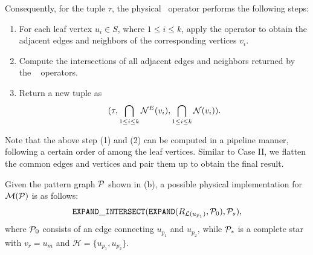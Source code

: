 Consequently, for the tuple $\tau$, the physical ~operator performs the following steps:

\begin{enumerate}
\item For each leaf vertex $u_i \in S$, where $1 \leq i \leq k$, apply the  operator to obtain the adjacent edges and neighbors of the corresponding vertices $v_i$.
\item Compute the intersections of all adjacent edges and neighbors returned by the \expand~ operators.
\item Return a new tuple as
\[
    (\tau, \bigcap_{1 \leq i \leq k}{\mathcal{N}}^E(v_i), \bigcap_{1 \leq i \leq k}{\mathcal{N}}(v_i)).
\]
\end{enumerate}

Note that the above step (1) and (2) can be computed in a pipeline manner, following a certain order of among the leaf vertices.
Similar to Case II, we flatten the common edges and vertices and pair them up to obtain the final result.

\begin{example}
    Given the pattern graph $\mathcal{P}$ shown in (b), a possible physical implementation for $\mathcal{M}(\mathcal{P})$ is as follows:
    \begin{equation*}
        \texttt{EXPAND}\_\texttt{INTERSECT}({\texttt{EXPAND}}({R_{\mathcal{L}(u_{p_1})}}, \mathcal{P}_{0}), \mathcal{P}_{s}),
    \end{equation*}
    where $\mathcal{P}_{0}$ consists of an edge connecting $u_{p_1}$ and $u_{p_2}$, while $\mathcal{P}_{s}$ is a complete star with $v_r = u_m$ and $\mathcal{H} = \{u_{p_1}, u_{p_2}\}$.
\end{example}
